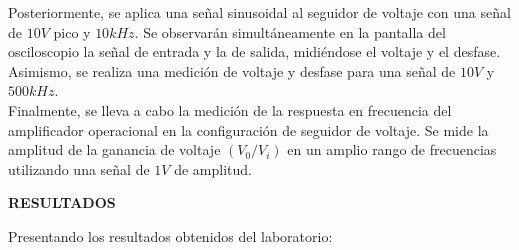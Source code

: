 \documentclass[12pt]{article}
\begin{document}
\begin{itemize}
		Posteriormente, se aplica una señal sinusoidal al seguidor de voltaje con una señal de $10V$ pico y $10kHz$. Se observarán simultáneamente en la pantalla del osciloscopio la señal de entrada y la de salida, midiéndose el voltaje y el desfase. Asimismo, se realiza una medición de voltaje y desfase para una señal de $10V$ y $500kHz$.\\
		
		Finalmente, se lleva a cabo la medición de la respuesta en frecuencia del amplificador operacional en la configuración de seguidor de voltaje. Se mide la amplitud de la ganancia de voltaje $(V_0/V_i)$ en un amplio rango de frecuencias utilizando una señal de $1V$ de amplitud.\\
		
	\end{itemize}
	
	\newpage
	
	\begin{center}
		\textbf{\large RESULTADOS}\\
	\end{center}

	Presentando los resultados obtenidos del laboratorio:
	
\end{document}
